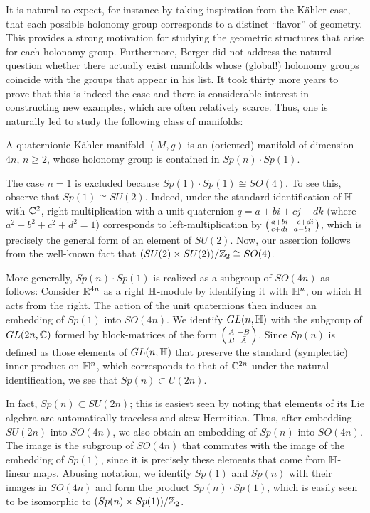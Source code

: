 It is natural to expect, for instance by taking inspiration from the K\"ahler case, that each possible holonomy group corresponds to a distinct ``flavor'' of geometry. This provides a strong motivation for studying the geometric structures that arise for each holonomy group. Furthermore, Berger did not address the natural question whether there actually exist manifolds whose (global!) holonomy groups coincide with the groups that appear in his list. It took thirty more years to prove that this is indeed the case and there is considerable interest in constructing new examples, which are often relatively scarce. Thus, one is naturally led to study the following class of manifolds:

\begin{mydef}
	A quaternionic K\"ahler manifold $(M,g)$ is an (oriented) manifold of dimension $4n$, $n\geq 2$, whose holonomy group is contained in $Sp(n)\cdot Sp(1)$.
\end{mydef}

The case $n=1$ is excluded because $Sp(1)\cdot Sp(1)\cong SO(4)$. To see this, observe that $Sp(1)\cong SU(2)$. Indeed, under the standard identification of $\mathbb{H}$ with $\mathbb{C}^2$, right-multiplication with a unit quaternion $q=a+bi+cj+dk$ (where $a^2+b^2+c^2+d^2=1$) corresponds to left-multiplication by 
$\begin{psmallmatrix}
	a+bi & -c+di \\ c+di & a-bi
\end{psmallmatrix}$, which is precisely the general form of an element of $SU(2)$. Now, our assertion follows from the well-known fact that $(SU(2)\times SU(2))/\mathbb{Z}_2\cong SO(4)$.

More generally, $Sp(n)\cdot Sp(1)$ is realized as a subgroup of $SO(4n)$ as follows: Consider $\mathbb{R}^{4n}$ as a right $\mathbb{H}$-module by identifying it with $\mathbb{H}^n$, on which $\mathbb{H}$ acts from the right. The action of the unit quaternions then induces an embedding of $Sp(1)$ into $SO(4n)$. We identify $GL(n,\mathbb{H})$ with the subgroup of $GL(2n,\mathbb{C})$ formed by block-matrices of the form 
$\begin{psmallmatrix}
	A & -\bar B \\ B & \bar A
\end{psmallmatrix}$. Since $Sp(n)$ is defined as those elements of $GL(n,\mathbb{H})$ that preserve the standard (symplectic) inner product on $\mathbb{H}^n$, which corresponds to that of $\mathbb{C}^{2n}$ under the natural identification, we see that $Sp(n)\subset U(2n)$. 

In fact, $Sp(n)\subset SU(2n)$; this is easiest seen by noting that elements of its Lie algebra are automatically traceless and skew-Hermitian. Thus, after embedding $SU(2n)$ into $SO(4n)$, we also obtain an embedding of $Sp(n)$ into $SO(4n)$. The image is the subgroup of $SO(4n)$ that commutes with the image of the embedding of $Sp(1)$, since it is precisely these elements that come from $\mathbb{H}$-linear maps. Abusing notation, we identify $Sp(1)$ and $Sp(n)$ with their images in $SO(4n)$ and form the product $Sp(n)\cdot Sp(1)$, which is easily seen to be isomorphic to $(Sp(n)\times Sp(1))/\mathbb{Z}_2$.

